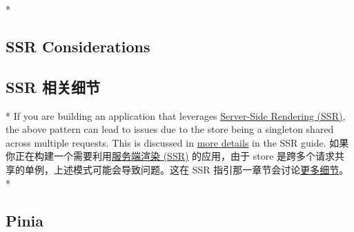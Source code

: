 \begin{paracol}{2}
 
\switchcolumn[0]*%
\subsection{SSR Considerations}
\switchcolumn
\subsection{SSR 相关细节}
\switchcolumn[0]*%
If you are building an application that leverages
\href{https://vuejs.org/guide/scaling-up/ssr.html}{Server-Side Rendering
(SSR)}, the above pattern can lead to issues due to the store being a
singleton shared across multiple requests. This is discussed in
\href{https://vuejs.org/guide/scaling-up/ssr.html\#cross-request-state-pollution}{more
details} in the SSR guide.
\switchcolumn
如果你正在构建一个需要利用\href{https://cn.vuejs.org/guide/scaling-up/ssr.html}{服务端渲染
(SSR)} 的应用，由于 store
是跨多个请求共享的单例，上述模式可能会导致问题。这在 SSR
指引那一章节会讨论\href{https://cn.vuejs.org/guide/scaling-up/ssr.html\#cross-request-state-pollution}{更多细节}。
\switchcolumn[0]*%
\subsection{Pinia}
\switchcolumn

\end{paracol}
